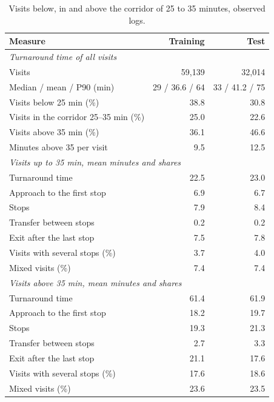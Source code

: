 \begin{table}[htbp]
\centering
\small
\begin{tabular}{lrr}
\toprule
\textbf{Measure} & \textbf{Training} & \textbf{Test} \\
\midrule
\multicolumn{3}{l}{\textit{Turnaround time of all visits}} \\
Visits & 59,139 & 32,014 \\
Median / mean / P90 (min) & 29 / 36.6 / 64 & 33 / 41.2 / 75 \\
Visits below 25 min (\%) & 38.8 & 30.8 \\
Visits in the corridor 25--35 min (\%) & 25.0 & 22.6 \\
Visits above 35 min (\%) & 36.1 & 46.6 \\
Minutes above 35 per visit & 9.5 & 12.5 \\
\midrule
\multicolumn{3}{l}{\textit{Visits up to 35 min, mean minutes and shares}} \\
Turnaround time & 22.5 & 23.0 \\
Approach to the first stop & 6.9 & 6.7 \\
Stops & 7.9 & 8.4 \\
Transfer between stops & 0.2 & 0.2 \\
Exit after the last stop & 7.5 & 7.8 \\
Visits with several stops (\%) & 3.7 & 4.0 \\
Mixed visits (\%) & 7.4 & 7.4 \\
\midrule
\multicolumn{3}{l}{\textit{Visits above 35 min, mean minutes and shares}} \\
Turnaround time & 61.4 & 61.9 \\
Approach to the first stop & 18.2 & 19.7 \\
Stops & 19.3 & 21.3 \\
Transfer between stops & 2.7 & 3.3 \\
Exit after the last stop & 21.1 & 17.6 \\
Visits with several stops (\%) & 17.6 & 18.6 \\
Mixed visits (\%) & 23.6 & 23.5 \\
\bottomrule
\end{tabular}
\par{}
\caption{Visits below, in and above the corridor of 25 to 35 minutes, observed logs.}
\label{tab:kpi_long_visits}
\end{table}
